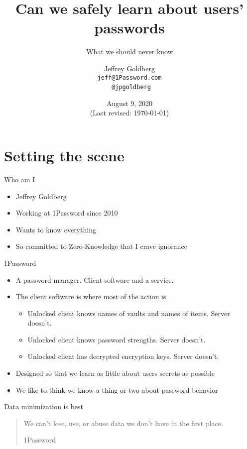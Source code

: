 \documentclass[xcolor={dvipsnames,table,hyperref}]{beamer}
\author[J.~Goldberg]
{Jeffrey Goldberg\\
  \texorpdfstring{\texttt{jeff@1Password.com}}{jeff\@1Password.org}\\
  \texorpdfstring{\faTwitter\ \texttt{@jpgoldberg}}{}}
\institute[1Password]{1Password}
\title{Can we safely learn about users' passwords}
\subtitle{What we should never know}
\date{August 9, 2020\\
\footnotesize{(Last revised: \today)}}
\begin{document}
\maketitle

\section{Setting the scene}

\begin{frame}{Who am I}
  \begin{itemize}
    \item Jeffrey Goldberg
    \item Working at 1Password since 2010
    \item Wants to know everything
    \item So committed to Zero-Knowledge that I crave ignorance
  \end{itemize}

\end{frame}

\begin{frame}{1Password}
  \begin{itemize}
    \item A password manager. Client software and a service.
    \item The client software is where most of the action is.
          \begin{itemize}
            \item Unlocked client knows names of vaults and names of items. Server doesn't.
            \item Unlocked client knows password strengths. Server doesn't.
            \item Unlocked client has decrypted encryption keys. Server doesn't.
          \end{itemize}
    \item Designed so that we learn as little about users secrets as possible
    \item We like to think we know a thing or two about password behavior
  \end{itemize}
\end{frame}

\begin{frame}{Data minimization is best}
  \blockquote[1Password]{We can't lose, use, or abuse data we don't have in the first place.}
\end{frame}
\end{document}
